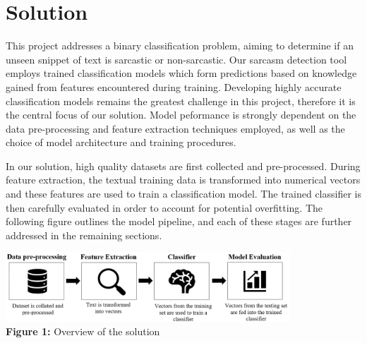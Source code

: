 \documentclass[12pt,a4paper]{article}
\begin{document}



\section{Solution}
\noindent This project addresses a binary classification problem, aiming to determine if an unseen snippet of text is sarcastic or non-sarcastic. Our sarcasm detection tool employs trained classification models which form  predictions based on knowledge gained from features encountered during training. Developing highly accurate classification models remains the greatest challenge in this project, therefore it is the central focus of our solution. Model peformance is strongly dependent on the data pre-processing and feature extraction techniques employed, as well as the choice of model architecture and training procedures. 

In our solution, high quality datasets are first collected and pre-processed. During feature extraction, the textual training data is transformed into numerical vectors and these features are used to train a classification model. The trained classifier is then carefully evaluated in order to account for potential overfitting. The following figure outlines the model pipeline, and each of these stages are further addressed in the remaining sections.

\begin{center}
	\includegraphics[width=0.8\textwidth]{Images/modelpipeline2.png}
	\label{Model Pipeline}\\
	\textbf{Figure 1:} Overview of the solution
\end{center}
\end{document}
